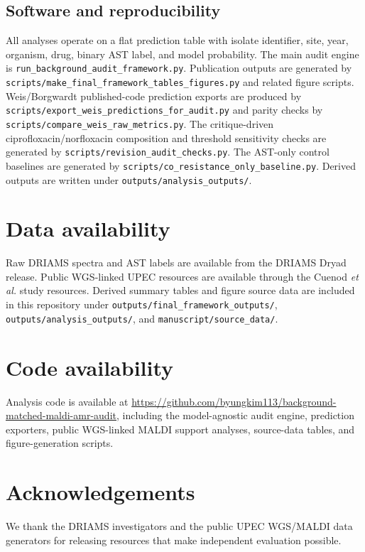\documentclass[11pt]{article}
\begin{document}
\subsection*{Software and reproducibility}

All analyses operate on a flat prediction table with isolate identifier, site, year, organism, drug, binary AST label, and model probability. The main audit engine is \texttt{run\_background\_audit\_framework.py}. Publication outputs are generated by \texttt{scripts/make\_final\_framework\_tables\_figures.py} and related figure scripts. Weis/Borgwardt published-code prediction exports are produced by \texttt{scripts/export\_weis\_predictions\_for\_audit.py} and parity checks by \texttt{scripts/compare\_weis\_raw\_metrics.py}. The critique-driven ciprofloxacin/norfloxacin composition and threshold sensitivity checks are generated by \texttt{scripts/revision\_audit\_checks.py}. The AST-only control baselines are generated by \texttt{scripts/co\_resistance\_only\_baseline.py}. Derived outputs are written under \texttt{outputs/analysis\_outputs/}.

\section*{Data availability}

Raw DRIAMS spectra and AST labels are available from the DRIAMS Dryad release\cite{driamsdryad}. Public WGS-linked UPEC resources are available through the Cuenod \textit{et al.} study resources\cite{cuenod2023papgii}. Derived summary tables and figure source data are included in this repository under \texttt{outputs/final\_framework\_outputs/}, \texttt{outputs/analysis\_outputs/}, and \texttt{manuscript/source\_data/}.

\section*{Code availability}

Analysis code is available at \url{https://github.com/byungkim113/background-matched-maldi-amr-audit}, including the model-agnostic audit engine, prediction exporters, public WGS-linked MALDI support analyses, source-data tables, and figure-generation scripts.

\section*{Acknowledgements}

We thank the DRIAMS investigators and the public UPEC WGS/MALDI data generators for releasing resources that make independent evaluation possible.
\end{document}
